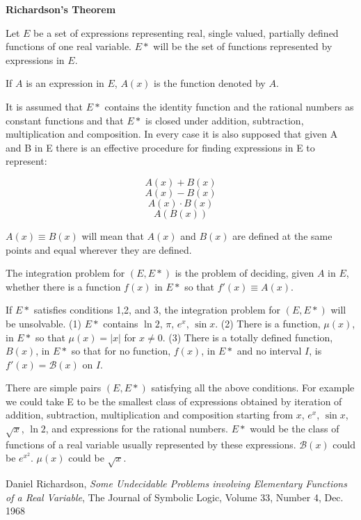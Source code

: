 \begin{mdframed}[backgroundcolor=yellow!20]
\begin{center}
{\bf Richardson's Theorem}
\end{center}


Let $E$ be a set of expressions representing real, single valued,
partially defined functions of one real variable. $E*$ will be the set of functions
represented by expressions in $E$.

If $A$ is an expression in $E$, $A(x)$ is the function denoted by $A$.

It is assumed that $E*$ contains the identity function and the rational numbers as
constant functions and that $E*$ is closed under addition, subtraction, multiplication and composition.
In every case it is also supposed that given A and B in E
there is an effective procedure for finding expressions in E to represent:

$$A(x) + B(x)$$
$$A(x) - B(x)$$
$$A(x) \cdot B(x)$$
$$A(B(x))$$

$A(x) \equiv B(x)$ will mean that $A(x)$ and $B(x)$ are defined at the same points and equal wherever they are defined.

The integration problem for $(E, E*)$ is the problem of deciding, given $A$ in $E$,
whether there is a function $f(x)$ in $E*$ so that $f'(x) \equiv A(x)$.

If $E*$ satisfies conditions 1,2, and 3, the integration problem for $(E, E*)$ will be unsolvable.
(1) $E*$ contains $\ln 2$, $\pi$, $e^x$, $\sin x$.
(2) There is a function, $\mu(x)$, in $E*$ so that $\mu(x)= |x|$ for $x \ne 0$.
(3) There is a totally defined function, $B(x)$, in $E*$ so that for no function, $f(x)$,
in $E*$ and no interval $I$, is $f'(x) = \mathcal{B}(x)$ on $I$.

There are simple pairs $(E, E*)$ satisfying all the above conditions. For example
we could take E to be the smallest class of expressions obtained by iteration of
addition, subtraction, multiplication and composition starting from $x$, $e^x$, $\sin x$,
$\sqrt{x}$, $\ln 2$, and expressions for the rational numbers. $E*$ would be the class of
functions of a real variable usually represented by these expressions. $\mathcal{B}(x)$ could be
$e^{x^2}$. $\mu(x)$ could be $\sqrt{x}$.

Daniel Richardson,
{\it Some Undecidable Problems involving Elementary Functions of a Real Variable},
The Journal of Symbolic Logic, Volume 33, Number 4, Dec. 1968

\end{mdframed}

